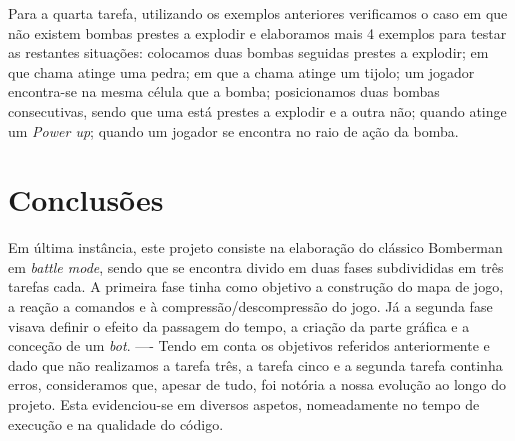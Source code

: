 \documentclass[a4paper]{article}
\begin{document}
Para a quarta tarefa, utilizando os exemplos anteriores verificamos o caso em que não existem bombas prestes a explodir e elaboramos mais 4 exemplos para testar as restantes situações: colocamos duas bombas seguidas prestes a explodir; em que chama atinge uma pedra; em que a chama atinge um tijolo; um jogador encontra-se na mesma célula que a bomba; posicionamos duas bombas consecutivas, sendo que uma está prestes a explodir e a outra não; quando atinge um \textit{Power up}; quando um jogador se encontra no raio de ação da bomba.

\cleardoublepage
\section{Conclusões}
\label{sec:conclusao}
Em última instância, este projeto consiste na elaboração do clássico Bomberman em \textit{battle mode}, sendo que se encontra divido em duas fases subdivididas em três tarefas cada. A primeira fase tinha como objetivo a construção do mapa de jogo, a reação a comandos e à compressão/descompressão do jogo. Já a segunda fase visava definir o efeito da passagem do tempo, a criação da parte gráfica e a conceção de um \textit{bot}. 
----
Tendo em conta os objetivos referidos anteriormente e dado que não realizamos a tarefa três, a tarefa cinco e a segunda tarefa continha erros, consideramos que, apesar de tudo, foi notória a nossa evolução ao longo do projeto. Esta evidenciou-se em diversos aspetos, nomeadamente  no tempo de execução e na qualidade do código.  
\end{document}
